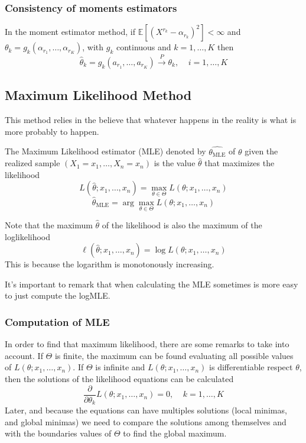 \subsubsection{Consistency of moments estimators}
In the moment estimator method, if $\mathbb{E}[(X^{r_k}-\alpha_{r_k})^2]<\infty$
and $\theta_k=g_k(\alpha_{r_1},\dots,\alpha_{r_K})$, with $g_k$ continuous and
$k=1,\dots,K$ then
\[ \hat{\theta}_k = g_k(a_{r_1},\dots,a_{r_K})\xrightarrow{P}\theta_k, \;\;\;\;
i=1,\dots,K \]

\subsection{Maximum Likelihood Method}
This method relies in the believe that whatever happens in the reality is what
is more probably to happen.

The Maximum Likelihood estimator (MLE) denoted by $\hat{\theta_{\text{MLE}}}$ of
$\theta$ given the realized sample $(X_1=x_1,\dots,X_n=x_n)$ is the value
$\hat{\theta}$ that maximizes the likelihood
\[ L(\hat{\theta};x_1,\dots,x_n) = \max_{\theta\in\Theta}L(\theta;x_1,\dots,x_n)
\]
\[ \hat{\theta}_{\text{MLE}} = \arg \max_{\theta\in\Theta}
L(\theta;x_1,\dots,x_n) \]
\begin{tcolorbox}
    Note that the maximum $\hat{\theta}$ of the likelihood is also the maximum
    of the loglikelihood
    \[ \ell(\hat{\theta};x_1,\dots,x_n) = \log L(\theta;x_1,\dots,x_n)\] This is
    because the logarithm is monotonously increasing.
\end{tcolorbox}
It's important to remark that when calculating the MLE sometimes is more easy to
just compute the logMLE.

\subsubsection{Computation of MLE}
In order to find that maximum likelihood, there are some remarks to take into
account. If $\Theta$ is finite, the maximum can be found evaluating all possible
values of $L(\theta;x_1,\dots,x_n)$. If $\Theta$ is infinite and
$L(\theta;x_1,\dots,x_n)$ is differentiable respect $\theta$, then the solutions
of the likelihood equations can be calculated
\[
\frac{\partial}{\partial\theta_k}L(\theta;x_1,\dots,x_n)=0,\;\;\;\;k=1,\dots,K
\] Later, and because the equations can have multiples solutions (local minimas,
and global minimas) we need to compare the solutions among themselves and with
the boundaries values of $\Theta$ to find the global maximum.

